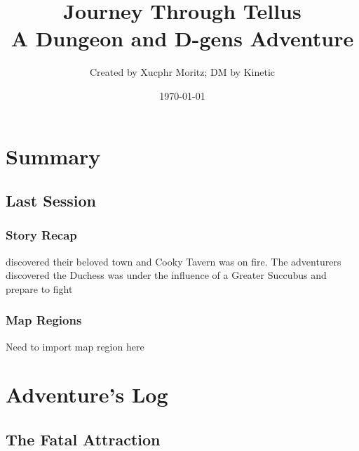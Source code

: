 \documentclass[letterpaper,twocolumn,openany,nodeprecatedcode]{dndbook}
\title{Journey Through Tellus \\
\large A Dungeon and D-gens Adventure}
\author{Created by Xucphr Moritz; DM by Kinetic}
\date{\today}
\begin{document}
\frontmatter

\maketitle

\tableofcontents

\mainmatter%

\part{Summary}


\chapter*{Last Session}
\section{Story Recap}
 discovered their beloved town and Cooky Tavern was on fire. The adventurers discovered the Duchess was under the influence of a Greater Succubus and prepare to fight

\section{Map Regions}

Need to import map region here



\part{Adventure's Log}
\chapter{The Fatal Attraction}

\end{document}
